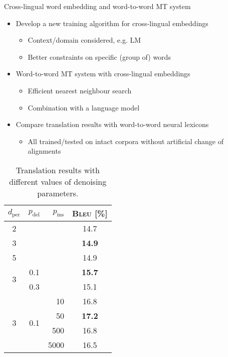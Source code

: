 \documentclass[11pt, a4paper, landscape]{article}
\begin{document}
	\NewPage
	\vfill
	Cross-lingual word embedding and word-to-word MT system
	\begin{itemize}
		\item Develop a new training algorithm for cross-lingual embeddings
		\begin{itemize}
			\item Context/domain considered, e.g. LM
			\item Better constraints on specific (group of) words\\
		\end{itemize}
		\item Word-to-word MT system with cross-lingual embeddings
		\begin{itemize}
			\item Efficient nearest neighbour search
			\item Combination with a language model\\
		\end{itemize}
		\item Compare translation results with word-to-word neural lexicons
		\begin{itemize}
			\item  All trained/tested on intact corpora without artificial change of alignments
			
		\end{itemize}
	\end{itemize}
	\vfill
	\NewPage
	\vfill
	\begin{table}[!ht]
		\centering
		\begin{tabular}{ccrc}
			\toprule
			$d_\text{per}$ & $p_\text{del}$ & $p_\text{ins}$ & \textsc{Bleu} [\%] \\
			\midrule
			2 & & & 14.7\\
			3 & & & \textbf{14.9}\\
			5 & & & 14.9\\
			\midrule
			\multirow{2}{*}{3} & 0.1 & & \textbf{15.7} \\
			& 0.3 & & 15.1 \\
			\midrule
			\multirow{6}{*}{3} & \multirow{6}{*}{0.1} & 10 & 16.8 \\
			& & 50 & \textbf{17.2} \\
			& & 500 & 16.8 \\
			& & 5000 & 16.5\\
			\bottomrule
		\end{tabular}
		\caption{Translation results with different values of denoising parameters.}
		\label{tab:denoising}
	\end{table}
	\vfill
	
\end{document}
